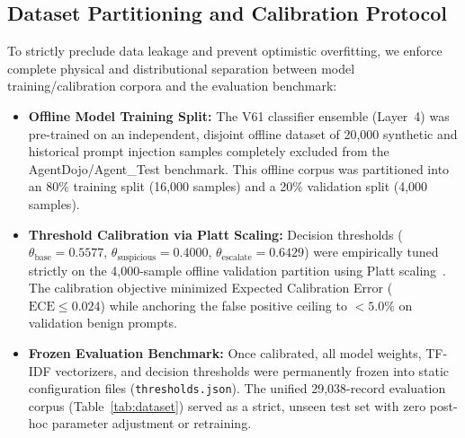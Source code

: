 \documentclass[conference]{IEEEtran}
\begin{document}
\subsection{Dataset Partitioning and Calibration Protocol}
To strictly preclude data leakage and prevent optimistic overfitting, we enforce complete physical and distributional separation between model training/calibration corpora and the evaluation benchmark:
\begin{itemize}[leftmargin=*]
    \item \textbf{Offline Model Training Split:} The V61 classifier ensemble (Layer~4) was pre-trained on an independent, disjoint offline dataset of 20,000 synthetic and historical prompt injection samples completely excluded from the AgentDojo/Agent\_Test benchmark. This offline corpus was partitioned into an 80\% training split (16,000 samples) and a 20\% validation split (4,000 samples).
    \item \textbf{Threshold Calibration via Platt Scaling:} Decision thresholds ($\theta_{\text{base}} = 0.5577$, $\theta_{\text{suspicious}} = 0.4000$, $\theta_{\text{escalate}} = 0.6429$) were empirically tuned strictly on the 4,000-sample offline validation partition using Platt scaling~\cite{platt1999probabilistic}. The calibration objective minimized Expected Calibration Error ($\text{ECE} \leq 0.024$) while anchoring the false positive ceiling to $<5.0\%$ on validation benign prompts.
    \item \textbf{Frozen Evaluation Benchmark:} Once calibrated, all model weights, TF-IDF vectorizers, and decision thresholds were permanently frozen into static configuration files (\texttt{thresholds.json}). The unified 29,038-record evaluation corpus (Table~\ref{tab:dataset}) served as a strict, unseen test set with zero post-hoc parameter adjustment or retraining.
\end{itemize}
\end{document}
